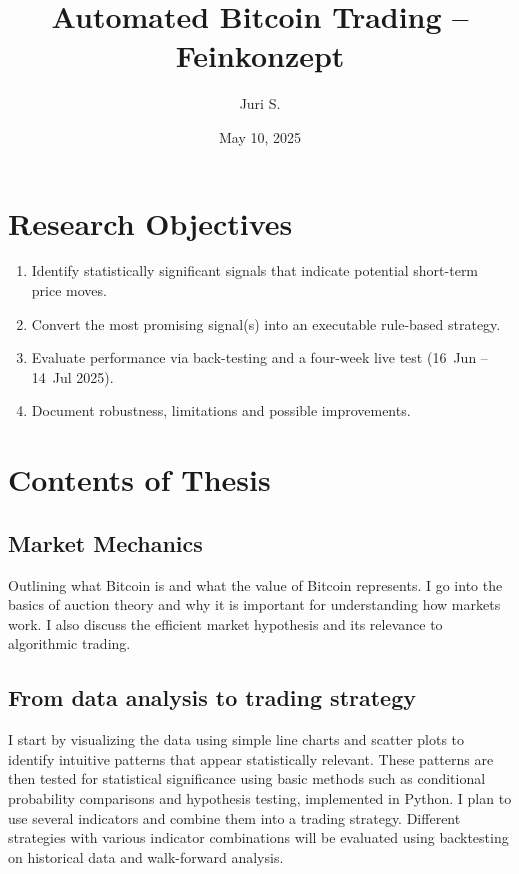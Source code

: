 \documentclass[12pt,a4paper]{article}
\title{Automated Bitcoin Trading – Feinkonzept}
\author{Juri S.}
\date{May 10, 2025}
\begin{document}
\maketitle
\tableofcontents
\newpage

\section{Research Objectives}
\begin{enumerate}
  \item Identify statistically significant signals that indicate potential short-term price moves.
  \item Convert the most promising signal(s) into an executable rule-based strategy.
  \item Evaluate performance via back-testing and a four-week live test (16~Jun – 14~Jul 2025).
  \item Document robustness, limitations and possible improvements.
\end{enumerate}

\section{Contents of Thesis}
\subsection{Market Mechanics}
Outlining what Bitcoin is and what the value of Bitcoin represents. I go into the basics of auction theory and why it is important for understanding
how markets work. I also discuss the efficient market hypothesis and its
relevance to algorithmic trading.

\subsection{From data analysis to trading strategy}
I start by visualizing the data using simple line charts and scatter plots to identify intuitive patterns that appear statistically relevant.
These patterns are then tested for statistical significance using basic methods such as conditional probability comparisons and hypothesis testing, implemented in Python.
I plan to use several indicators and combine them into a trading strategy. 
Different strategies with various indicator combinations will be evaluated using backtesting on historical data and walk-forward analysis.

\end{document}
